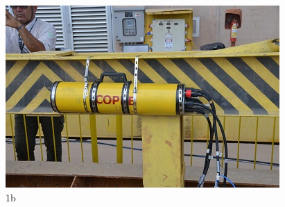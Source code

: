 \begin{figure}[h!]
  \centering
  \includegraphics[width=1\linewidth]{Fotos/JirauJunho2014/10.jpg}
  \caption{1b}
  \label{nov20134}
\end{figure}